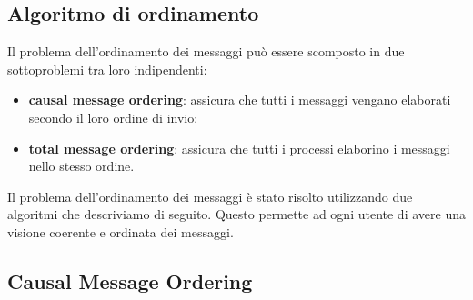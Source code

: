 \documentclass[a4paper]{article}
\begin{document}
\subsection{Algoritmo di ordinamento}\label{ordinamento}

Il problema dell'ordinamento dei messaggi può essere scomposto in due sottoproblemi tra loro indipendenti:

\begin{itemize}
%
    \item\textbf{causal message ordering}: assicura che tutti i messaggi vengano elaborati secondo il loro ordine di invio;
%
    \item\textbf{total message ordering}: assicura che tutti i processi elaborino i messaggi nello stesso ordine.
%
\end{itemize}

Il problema dell'ordinamento dei messaggi è stato risolto utilizzando due algoritmi che descriviamo di seguito. Questo permette ad ogni utente di avere una visione coerente e ordinata dei messaggi.

\subsection{Causal Message Ordering}\label{causal-message-ordering}
\end{document}

